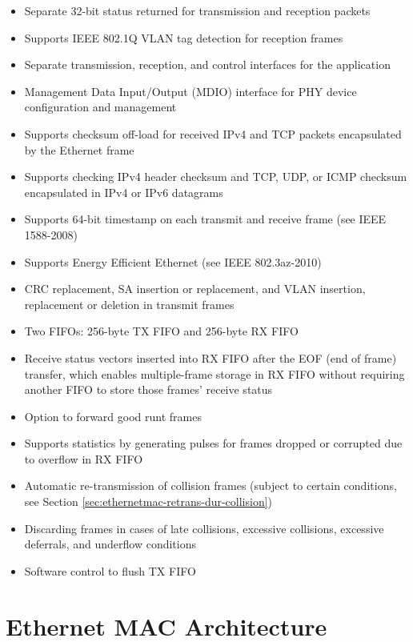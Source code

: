\documentclass[main\_\_EN.tex]{subfiles}
\begin{document}
\begin{itemize}
\begin{itemize}
        \item Passes all incoming packets (as per filter) with a status report
    \end{itemize}
	\item Separate 32-bit status returned for transmission and reception packets
        \item Supports IEEE 802.1Q VLAN tag detection for reception frames
	\item Separate transmission, reception, and control interfaces for the application
	\item Management Data Input/Output (MDIO) interface for PHY device configuration and management
	\item Supports checksum off-load for received IPv4 and TCP packets encapsulated by the Ethernet frame
	\item Supports checking IPv4 header checksum and TCP, UDP, or ICMP checksum encapsulated in IPv4 or IPv6 datagrams
	\item Supports 64-bit timestamp on each transmit and receive frame (see IEEE 1588-2008)
        \item Supports Energy Efficient Ethernet (see IEEE 802.3az-2010)
        \item CRC replacement, SA insertion or replacement, and VLAN insertion, replacement or deletion in transmit frames
	\item Two FIFOs: 256-byte TX FIFO and 256-byte RX FIFO
        \item Receive status vectors inserted into RX FIFO after the EOF (end of frame) transfer, which enables multiple-frame storage in RX FIFO without requiring another FIFO to store those frames' receive status
        \item Option to forward good runt frames
	\item Supports statistics by generating pulses for frames dropped or corrupted due to overflow in RX FIFO
	\item Automatic re-transmission of collision frames  (subject to certain conditions, see Section \ref{sec:ethernetmac-retrans-dur-collision})
	\item Discarding frames in cases of late collisions, excessive collisions, excessive deferrals, and underflow conditions
	\item Software control to flush TX FIFO
\end{itemize}

\section{Ethernet MAC Architecture}
\end{document}

